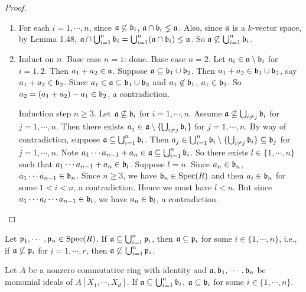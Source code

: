 \begin{proof}
    \begin{enumerate}
        \item For each $i = 1,\cdots,n$, since $\mathfrak{a} \not \subseteq \mathfrak{b}_i$, $\mathfrak{a} \cap \mathfrak{b}_i \lneq \mathfrak{a}$. Also, since $\mathfrak{a}$ is a $k$-vector space, by Lemma 1.48, $\mathfrak{a} \cap \bigcup_{i=1}^n \mathfrak{b}_i = \bigcup_{i=1}^n (\mathfrak{a} \cap \mathfrak{b}_i) \lneq \mathfrak{a}$. So $\mathfrak{a} \not \subseteq \bigcup_{i=1}^n \mathfrak{b}_i$. 
        \item Induct on $n$. Base case $n = 1$: done. Base case $n = 2$. Let $a_i \in \mathfrak{a} \setminus \mathfrak{b}_i$ for $i = 1,2$. Then $a_1 + a_2 \in \mathfrak{a}$. Suppose $\mathfrak{a} \subseteq \mathfrak{b}_1 \cup \mathfrak{b}_2$. Then $a_1 + a_2 \in \mathfrak{b}_1 \cup \mathfrak{b}_2$, say $a_1 + a_2 \in \mathfrak{b}_2$. Since $a_1 \in \mathfrak{a} \subseteq \mathfrak{b}_1 \cup \mathfrak{b}_2$ and $a_1 \not \in \mathfrak{b}_1$, $a_1 \in \mathfrak{b}_2$. So $a_2 = (a_1 + a_2) - a_1 \in \mathfrak{b}_2$, a contradiction. \par 
            Induction step $n \geq 3$. Let $\mathfrak{a} \not \subseteq \mathfrak{b}_i$ for $i = 1,\cdots,n$. Assume $\mathfrak{a} \not \subseteq \bigcup_{i \neq j} \mathfrak{b}_i$ for $j = 1,\cdots,n$. Then there exists $a_j \in \mathfrak{a} \setminus \{\bigcup_{i \neq j} \mathfrak{b}_i\}$ for $j = 1,\cdots,n$. By way of contradiction, suppose $\mathfrak{a} \subseteq \bigcup_{i=1}^n \mathfrak{b}_i$. Then $a_j \in \bigcup_{i=1}^n \mathfrak{b}_i \setminus \{\bigcup_{i \neq j}\mathfrak{b}_i\} \subseteq \mathfrak{b}_j$ for $j = 1,\cdots,n$. Note $a_1 \cdots a_{n-1} + a_n \in \mathfrak{a} \subseteq \bigcup_{i=1}^n \mathfrak{b}_i$. So there exists $l \in \{1,\cdots,n\}$ such that $a_1 \cdots a_{n-1} + a_n \in \mathfrak{b}_l$. Suppose $l=n$. Since $a_n \in \mathfrak{b}_n$, $a_1 \cdots a_{n-1} \in \mathfrak{b}_n$. Since $n \geq 3$, we have $\mathfrak{b}_n \in \operatorname{Spec}(R)$ and then $a_i \in \mathfrak{b}_n$ for some $1 < i < n$, a contradiction. Hence we must have $l < n$. But since $a_1 \cdots a_l \cdots a_{n-1} \in \mathfrak{b}_l$, we have $a_n \in \mathfrak{b}_l$, a contradiction. \qedhere
    \end{enumerate}
\end{proof}

\begin{theorem}
    Let $\mathfrak{p}_1,\cdots,\mathfrak{p}_n \in \operatorname{Spec}(R)$. If $\mathfrak{a} \subseteq \bigcup_{i=1}^n \mathfrak{p}_i$, then $\mathfrak{a} \subseteq \mathfrak{p}_i$ for some $i \in \{1,\cdots,n\}$, i.e., if $\mathfrak{a} \not \subseteq \mathfrak{p}_i$ for $i = 1,\cdots,r$, then $\mathfrak{a} \not \subseteq \bigcup_{i=1}^n \mathfrak{p}_i$.
\end{theorem}

\begin{fact*} 
    Let $A$ be a nonzero commutative ring with identity and $\mathfrak{a},\mathfrak{b}_1,\cdots,\mathfrak{b}_n$ be monomial ideals of $A[X_1,\cdots,X_d]$. If $\mathfrak{a} \subseteq \bigcup_{i=1}^n \mathfrak{b}_i$, $\mathfrak{a} \subseteq \mathfrak{b}_i$ for some $i \in \{1,\cdots,n\}$.
\end{fact*}

